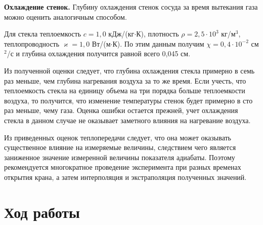 \documentclass[a4paper,12pt]{article} %
\begin{document}
\newpage
\noindent \textbf{Охлаждение стенок.} Глубину охлаждения стенок сосуда за время вытекания газа можно оценить аналогичным способом.


Для стекла теплоемкость $c = 1,0$ кДж/(кг$\cdot$К), плотность $\rho = 2,5 \cdot 10^3$ кг/м$^3$, теплопроводность $\varkappa = 1,0$ Вт/(м$\cdot$К). По этим данным получим $\chi = 0,4 \cdot 10^{-2}$ см$^2$/с и глубина охлаждения получится равной всего 0,045 см.


Из полученной оценки следует, что глубина охлаждения стекла примерно в семь раз меньше, чем глубина нагревания воздуха за то же время. Если учесть, что теплоемкость стекла на единицу объема на три порядка больше теплоемкости воздуха, то получится, что изменение температуры стенок будет примерно в сто раз меньше, чему газа. Оценка ошибки остается прежней, учет охлаждения стекла в данном случае не оказывает заметного влияния на нагревание воздуха.


Из приведенных оценок теплопередачи следует, что она может оказывать существенное влияние на измеряемые величины, следствием чего является заниженное значение измеренной величины показателя адиабаты. Поэтому рекомендуется многократное проведение эксперимента при разных временах открытия крана, а затем интерполяция и экстраполяция полученных значений.

\newpage
\section*{Ход работы}
\end{document}
